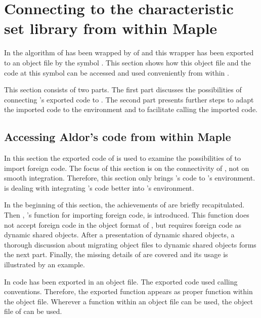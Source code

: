\clearpage
\section{Connecting to the characteristic set library from within Maple}

In  the  algorithm of  has been wrapped by  of  and this wrapper has been exported to an object file by the symbol \exportedsymbol. This section shows how this object file and the code at this symbol can be accessed and used conveniently from within \Maple.

This section consists of two parts.
The first part discusses the possibilities of connecting \Aldor's exported code to \Maple. 
The second part presents further steps to adapt the imported code to the \Maple environment and to facilitate calling the imported code.

\subsection{Accessing Aldor's code from within Maple}

In this section the exported \Aldor code of  is used to examine the possibilities of \Maple to import foreign code. The focus of this section is on the connectivity of \Maple, not on smooth integration. Therefore, this section only brings \Aldor's code to \Maple's environment.  is dealing with integrating \Aldor's code better into \Maple's environment.

In the beginning of this section, the achievements of  are briefly recapitulated. Then , \Maple's function for importing foreign code, is introduced. This function does not accept foreign code in the object format of , but requires foreign code as dynamic shared objects. After a presentation of dynamic shared objects, a thorough discussion about migrating object files to dynamic shared objects forms the next part. Finally, the missing details of  are covered and its usage is illustrated by an example.

In  \Aldor code has been exported in an object file. The exported code used \C calling conventions. Therefore, the exported function appears as proper \C function within the object file. Wherever a \C function within an object file can be used, the object file of  can be used.


